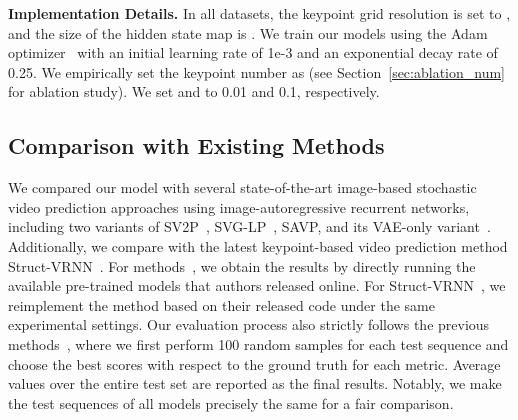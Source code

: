 \documentclass[letterpaper, 10 pt, conference]{ieeeconf}
\begin{document}
\noindent\textbf{Implementation Details.} 
In all datasets, the keypoint grid resolution is set to , and the size of the hidden state map is .
We train our models using the Adam optimizer~\cite{kingma2014adam} with an initial learning rate of 1e-3 and an exponential decay rate of 0.25. 
We empirically set the keypoint number as  (see Section~\ref{sec:ablation_num} for ablation study). 
We set  and  to 0.01 and 0.1, respectively.





 

\subsection{Comparison with Existing Methods}
We compared our model with several state-of-the-art image-based stochastic video prediction approaches using image-autoregressive recurrent networks, including two variants of SV2P~\cite{babaeizadeh2018stochastic}, SVG-LP~\cite{denton2018stochastic}, SAVP, and its VAE-only variant~\cite{lee2018stochastic}. Additionally, we compare with the latest keypoint-based video prediction method Struct-VRNN~\cite{minderer2019unsupervised}.
For methods~\cite{babaeizadeh2018stochastic,denton2018stochastic,lee2018stochastic}, we obtain the results by directly running the available pre-trained models that authors released online.
For Struct-VRNN~\cite{minderer2019unsupervised}, we reimplement the method based on their released code under the same experimental settings.
Our evaluation process also strictly follows the previous methods~\cite{babaeizadeh2018stochastic,denton2018stochastic,lee2018stochastic}, where we first perform 100 random samples for each test sequence and choose the best scores with respect to the ground truth for each metric.
Average values over the entire test set are reported as the final results. 
Notably, we make the test sequences of all models precisely the same for a fair comparison.
\end{document}
